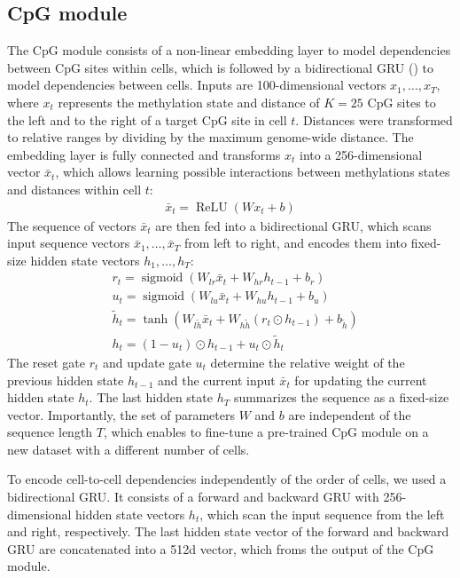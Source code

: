 \subsection{CpG module}

The CpG module consists of a non-linear embedding layer to model dependencies between CpG sites within cells, which is followed by a bidirectional GRU () to model dependencies between cells. Inputs are 100-dimensional vectors $x_1,\ldots,x_T$, where $x_t$ represents the methylation state and distance of $K=25$ CpG sites to the left and to the right of a target CpG site in cell $t$. Distances were transformed to relative ranges by dividing by the maximum genome-wide distance. The embedding layer is fully connected and transforms $x_t$ into a 256-dimensional vector $\bar{x}_t$, which allows learning possible interactions between methylations states and distances within cell $t$:
\begin{align}
  \bar{x}_t=\operatorname{ReLU} (W x_t + b)
\end{align}
The sequence of vectors $\bar{x}_t$ are then fed into a bidirectional GRU, which scans input sequence vectors $\bar{x}_1,\ldots,\bar{x}_T$ from left to right, and encodes them into fixed-size hidden state vectors $h_1,\ldots,h_T$:
\begin{align}
  &r_t=\operatorname{sigmoid}(W_{lr} \bar{x}_t + W_{hr} h_{t-1} + b_{r}) \nonumber \\
  &u_t=\operatorname{sigmoid}(W_{lu} \bar{x}_t + W_{hu} h_{t-1} + b_{u}) \nonumber \\
  &\tilde{h}_t=\operatorname{tanh}\left(W_{l\tilde{h}} \bar{x}_t + W_{h\tilde{h}}(r_t \odot h_{t-1}) + b_{\tilde{h}}\right) \nonumber \\
  &h_t = (1 - u_t) \odot h_{t-1} + u_t \odot \tilde{h}_t
\end{align}
The reset gate $r_t$ and update gate $u_t$ determine the relative weight of the previous hidden state $h_{t-1}$ and the current input $\bar{x}_t$ for updating the current hidden state $h_t$. The last hidden state $h_T$ summarizes the sequence as a fixed-size vector. Importantly, the set of parameters $W$ and $b$ are independent of the sequence length $T$, which enables to fine-tune a pre-trained CpG module on a new dataset with a different number of cells.

To encode cell-to-cell dependencies independently of the order of cells, we used a bidirectional GRU. It consists of a forward and backward GRU with 256-dimensional hidden state vectors $h_t$, which scan the input sequence from the left and right, respectively. The last hidden state vector of the forward and backward GRU are concatenated into a 512d vector, which froms the output of the CpG module.


